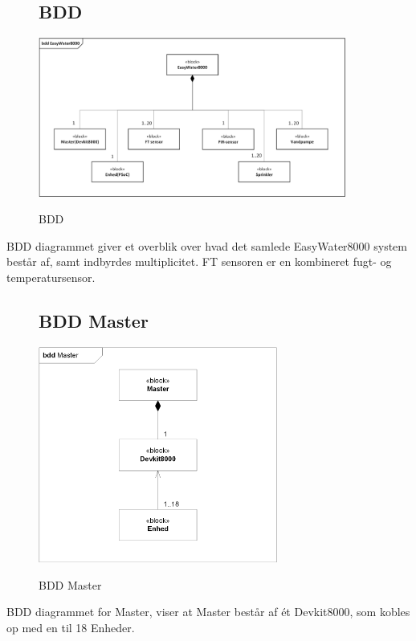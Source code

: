 \begin{figure}[H] \centering
\subsection{BDD}
{\includegraphics[width=0.9\textwidth]{filer/systemarkitektur/BDD}}
\caption{BDD}
\label{lab:bdd}
\raggedright
\end{figure}
BDD diagrammet giver et overblik over hvad det samlede EasyWater8000 system består af, samt indbyrdes multiplicitet. FT sensoren er en kombineret fugt- og temperatursensor.  \newline \newline

\begin{figure}[H] \centering
\subsection{BDD Master}
{\includegraphics[width=0.7\textwidth]{filer/systemarkitektur/BDD_Master}}
\caption{BDD Master}
\label{lab:bddmaster}
\raggedright
\end{figure}
BDD diagrammet for Master, viser at Master består af ét Devkit8000, som kobles op med en til 18 Enheder.

